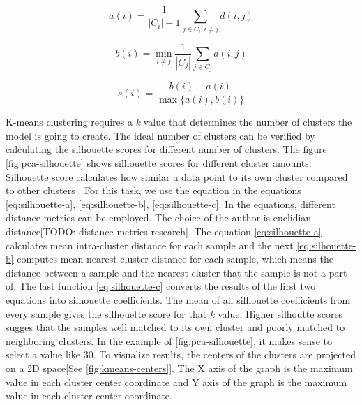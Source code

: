 \begin{equation}
a(i)=\frac{1}{\left|C_{i}\right|-1} \sum_{j \in C_{i}, i \neq j} d(i, j)
\label{eq:silhouette-a}
\end{equation}

\begin{equation}
b(i)=\min _{i \neq j} \frac{1}{\left|C_{j}\right|} \sum_{j \in C_{j}} d(i, j)
\label{eq:silhouette-b}
\end{equation}

\begin{equation}
s(i)=\frac{b(i)-a(i)}{\max \{a(i), b(i)\}}
\label{eq:silhouette-c}
\end{equation}

K-means clustering  requires a \textit{k} value that determines the number of clusters the model is going to create. The ideal number of clusters can be verified by calculating the silhouette scores for different number of clusters. The figure \ref{fig:pca-silhouette} shows silhouette scores for different cluster amounts. Silhouette score calculates how similar a data point to its own cluster compared to other clusters \parencite{rousseeuw1987silhouettes}. For this task, we use the equation in the equations \ref{eq:silhouette-a}, \ref{eq:silhouette-b}, \ref{eq:silhouette-c}. In the equations, different distance metrics can be employed. The choice of the author is euclidian distance[TODO: distance metrics research].  The equation \ref{eq:silhouette-a} calculates mean intra-cluster distance for each sample and the next \ref{eq:silhouette-b} computes mean nearest-cluster distance for each sample, which means the distance between a sample and the nearest cluster that the sample is not a part of. The last function \ref{eq:silhouette-c} converts the results of the first two equations into silhouette coefficients. The mean of all silhouette coefficients from every sample gives the silhouette score for that \textit{k} value. Higher silhoutte scores sugges that the samples well matched to its own cluster and poorly matched to neighboring clusters. In the example of \ref{fig:pca-silhouette}, it makes sense to select a value like 30. To visualize results, the centers of the clusters are projected on a 2D space[See \ref{fig:kmeans-centers}]. The X axis of the graph is the maximum value in each cluster center coordinate and Y axis of the graph is the maximum value in each cluster center coordinate.

